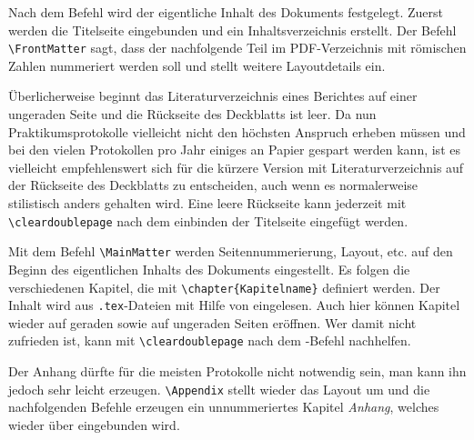Nach dem Befehl \verb|| wird der eigentliche Inhalt des 
Dokuments festgelegt. Zuerst werden die Titelseite eingebunden und ein 
Inhaltsverzeichnis erstellt. Der Befehl \verb|\FrontMatter| sagt, dass der 
nachfolgende Teil im PDF-Verzeichnis mit römischen Zahlen nummeriert werden soll 
und stellt weitere Layoutdetails ein.

Überlicherweise beginnt das Literaturverzeichnis eines Berichtes auf einer 
ungeraden Seite und die Rückseite des Deckblatts ist leer. Da nun 
Praktikumsprotokolle vielleicht nicht den höchsten Anspruch erheben müssen und 
bei den vielen Protokollen pro Jahr einiges an Papier gespart werden kann, ist 
es vielleicht empfehlenswert sich für die kürzere Version mit 
Literaturverzeichnis auf der Rückseite des Deckblatts zu entscheiden, auch wenn 
es normalerweise stilistisch anders gehalten wird. Eine leere Rückseite kann 
jederzeit mit \verb|\cleardoublepage| nach dem einbinden der Titelseite 
eingefügt werden.

Mit dem Befehl \verb|\MainMatter| werden Seitennummerierung, Layout, etc. auf 
den Beginn des eigentlichen Inhalts des Dokuments eingestellt. Es folgen die 
verschiedenen Kapitel, die mit \verb|\chapter{Kapitelname}| definiert werden. 
Der Inhalt wird aus \verb|.tex|-Dateien mit Hilfe von \verb|| 
eingelesen. Auch hier können Kapitel wieder auf geraden sowie auf ungeraden 
Seiten eröffnen. Wer damit nicht zufrieden ist, kann mit \verb|\cleardoublepage| 
nach dem \verb||-Befehl nachhelfen.

Der Anhang dürfte für die meisten Protokolle nicht notwendig sein, man kann ihn 
jedoch sehr leicht erzeugen. \verb|\Appendix| stellt wieder das Layout um und 
die nachfolgenden Befehle erzeugen ein unnummeriertes Kapitel \textit{Anhang}, 
welches wieder über \verb|| eingebunden wird.

